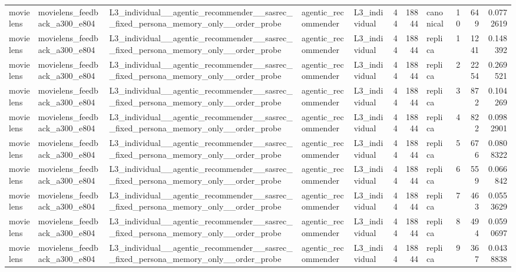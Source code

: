 \begin{table}[htbp!]
\begin{tabular}{lllllrrlrrr}
movielens & movielens\_feedback\_a300\_e804 & L3\_individual\_\_agentic\_recommender\_\_sasrec\_\_fixed\_persona\_memory\_only\_\_order\_probe & agentic\_recommender & L3\_individual & 44 & 18844 & canonical & 10 & 649 & 0.0772619 \\
movielens & movielens\_feedback\_a300\_e804 & L3\_individual\_\_agentic\_recommender\_\_sasrec\_\_fixed\_persona\_memory\_only\_\_order\_probe & agentic\_recommender & L3\_individual & 44 & 18844 & replica & 1 & 1241 & 0.148392 \\
movielens & movielens\_feedback\_a300\_e804 & L3\_individual\_\_agentic\_recommender\_\_sasrec\_\_fixed\_persona\_memory\_only\_\_order\_probe & agentic\_recommender & L3\_individual & 44 & 18844 & replica & 2 & 2254 & 0.269521 \\
movielens & movielens\_feedback\_a300\_e804 & L3\_individual\_\_agentic\_recommender\_\_sasrec\_\_fixed\_persona\_memory\_only\_\_order\_probe & agentic\_recommender & L3\_individual & 44 & 18844 & replica & 3 & 872 & 0.104269 \\
movielens & movielens\_feedback\_a300\_e804 & L3\_individual\_\_agentic\_recommender\_\_sasrec\_\_fixed\_persona\_memory\_only\_\_order\_probe & agentic\_recommender & L3\_individual & 44 & 18844 & replica & 4 & 822 & 0.0982901 \\
movielens & movielens\_feedback\_a300\_e804 & L3\_individual\_\_agentic\_recommender\_\_sasrec\_\_fixed\_persona\_memory\_only\_\_order\_probe & agentic\_recommender & L3\_individual & 44 & 18844 & replica & 5 & 676 & 0.0808322 \\
movielens & movielens\_feedback\_a300\_e804 & L3\_individual\_\_agentic\_recommender\_\_sasrec\_\_fixed\_persona\_memory\_only\_\_order\_probe & agentic\_recommender & L3\_individual & 44 & 18844 & replica & 6 & 559 & 0.066842 \\
movielens & movielens\_feedback\_a300\_e804 & L3\_individual\_\_agentic\_recommender\_\_sasrec\_\_fixed\_persona\_memory\_only\_\_order\_probe & agentic\_recommender & L3\_individual & 44 & 18844 & replica & 7 & 463 & 0.0553629 \\
movielens & movielens\_feedback\_a300\_e804 & L3\_individual\_\_agentic\_recommender\_\_sasrec\_\_fixed\_persona\_memory\_only\_\_order\_probe & agentic\_recommender & L3\_individual & 44 & 18844 & replica & 8 & 494 & 0.0590697 \\
movielens & movielens\_feedback\_a300\_e804 & L3\_individual\_\_agentic\_recommender\_\_sasrec\_\_fixed\_persona\_memory\_only\_\_order\_probe & agentic\_recommender & L3\_individual & 44 & 18844 & replica & 9 & 367 & 0.0438838 \\

\end{tabular}
\end{table}
